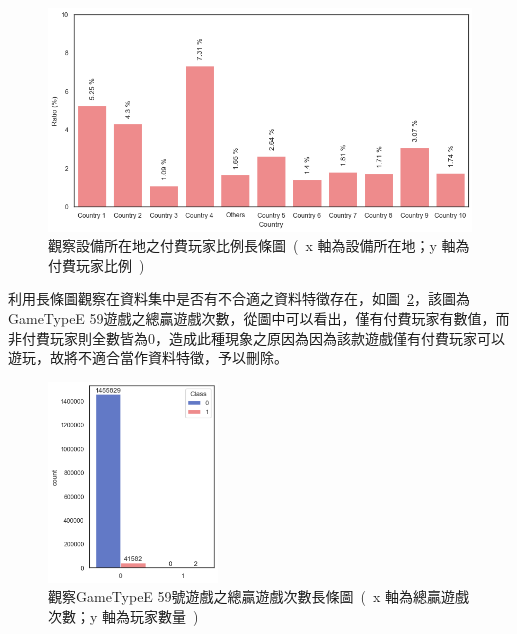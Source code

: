 \begin{figure}[!htb]
    \begin{center}
      \includegraphics[width=1\textwidth]{figures/evaluation/Image_CountryPayerRatioBarPlot.png}
      \caption[觀察設備所在地之付費玩家比例長條圖]{觀察設備所在地之付費玩家比例長條圖\ (\ x 軸為設備所在地；y 軸為付費玩家比例\ )\ }
      \label{fig:eva_CountryPayerRatioBarPlot}
    \end{center}
\end{figure}

利用長條圖觀察在資料集中是否有不合適之資料特徵存在，如圖~\ref{fig:eva_UnreasonableFeatureBarPlot}，該圖為GameTypeE 59遊戲之總贏遊戲次數，從圖中可以看出，僅有付費玩家有數值，而非付費玩家則全數皆為0，造成此種現象之原因為因為該款遊戲僅有付費玩家可以遊玩，故將不適合當作資料特徵，予以刪除。

\begin{figure}[!htb]
    \begin{center}
      \includegraphics[width=0.4\textwidth]{figures/evaluation/Image_UnreasonableFeatureBarPlot.png}
      \caption[觀察GameTypeE 59號遊戲之總贏遊戲次數長條圖]{觀察GameTypeE 59號遊戲之總贏遊戲次數長條圖\ (\ x 軸為總贏遊戲次數；y 軸為玩家數量\ )\ }
      \label{fig:eva_UnreasonableFeatureBarPlot}
    \end{center}
\end{figure}
\newpage

